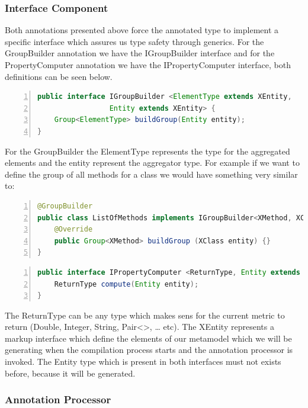 \subsubsection{Interface Component}

	Both annotations presented above force the annotated type to implement a
specific interface which assures us type safety through generics. For the
GroupBuilder annotation we have the IGroupBuilder interface and for the
PropertyComputer annotation we have the IPropertyComputer interface, both
definitions can be seen below.

	\small
	\begin{lstlisting}[language=Java,numbers=left]
public interface IGroupBuilder <ElementType extends XEntity, 
                 Entity extends XEntity> {
	Group<ElementType> buildGroup(Entity entity);
}
	\end{lstlisting}
	\normalsize{} \label{codeSection:IGroupBuilder}
	
	For the GroupBuilder the ElementType represents the type for the aggregated
elements and the entity represent the aggregator type. For example if we want to
define the group of all methods for a class we would have something very
similar to:
	\small
\begin{lstlisting}[language=Java,numbers=left]
@GroupBuilder
public class ListOfMethods implements IGroupBuilder<XMethod, XClass> {
	@Override
	public Group<XMethod> buildGroup (XClass entity) {}
}
\end{lstlisting}
	\normalsize{} 
	
	\small
	\begin{lstlisting}[language=Java,numbers=left]
public interface IPropertyComputer <ReturnType, Entity extends XEntity> {
	ReturnType compute(Entity entity);
}	
	\end{lstlisting}
	\normalsize{} \label{codeSection:IPropertyComputer}
	
	The ReturnType can be any type which makes sens for the current metric
to return (Double, Integer, String, Pair<>, \ldots{} etc). 
	The XEntity represents a markup interface which define the elements of our
metamodel which we will be generating when the compilation process starts and
the annotation processor is invoked. The Entity type which is present in both 
interfaces must not exists before, because it will be generated.
		
\subsubsection{Annotation Processor}
	
